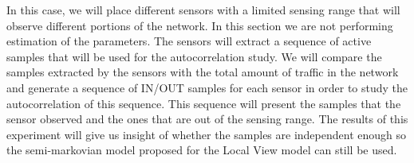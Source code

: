 In this case, we will place different sensors with a limited sensing range that will observe different portions of the network. In this section we are not performing estimation of the parameters. The sensors will extract a sequence of active samples that will be used for the autocorrelation study. We will compare the samples extracted by the sensors with the total amount of traffic in the network and generate a sequence of IN/OUT samples for each sensor in order to study the autocorrelation of this sequence. This sequence will present the samples that the sensor observed and the ones that are out of the sensing range. The results of this experiment will give us insight of whether the samples are independent enough so the semi-markovian model proposed for the Local View model can still be used.